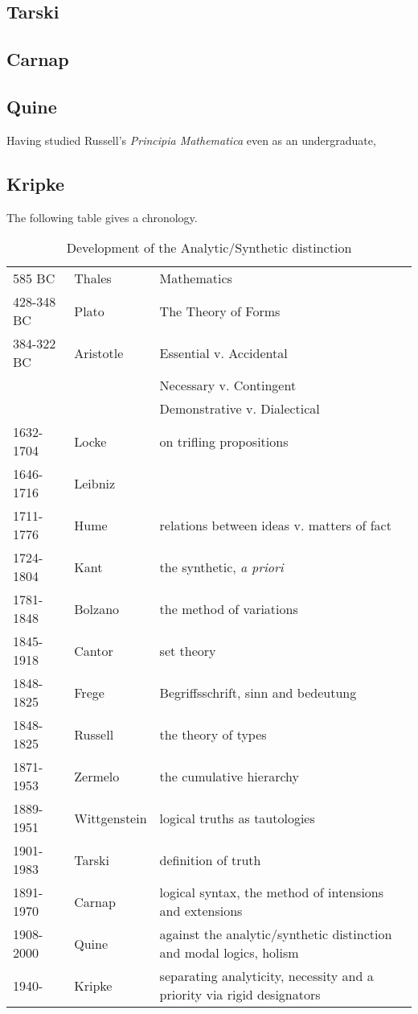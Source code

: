 \subsection{Tarski}

\subsection{Carnap}

\subsection{Quine}

Having studied Russell's \emph{Principia Mathematica} even as an undergraduate, 

\subsection{Kripke}
The following table gives a chronology.

\begin{table}[h]
\begin{center}
\begin{tabular}{|l l p{4.5cm}|}
\hline
585 BC & Thales & Mathematics\\
428-348 BC & Plato & The Theory of Forms\\
384-322 BC & Aristotle & Essential v. Accidental \\
& & Necessary v. Contingent\\
& & Demonstrative v. Dialectical\\
1632-1704 & Locke & on trifling propositions\\
1646-1716 & Leibniz & \\
1711-1776 & Hume & relations between ideas v. matters of fact \\
1724-1804 & Kant & the synthetic, \emph{a priori} \\
1781-1848 & Bolzano & the method of variations \\
1845-1918 & Cantor & set theory \\
1848-1825 & Frege & Begriffsschrift, sinn and bedeutung \\
1848-1825 & Russell & the theory of types \\
1871-1953 & Zermelo & the cumulative hierarchy \\
1889-1951 & Wittgenstein & logical truths as tautologies \\
1901-1983 & Tarski & definition of truth \\
1891-1970 & Carnap & logical syntax, the method of intensions and extensions\\
1908-2000 & Quine & against the analytic/synthetic distinction and modal logics, holism\\
1940- & Kripke & separating analyticity, necessity and a priority via rigid designators\\
\hline
\end{tabular}
\caption{Development of the Analytic/Synthetic distinction}
\label{tab:AnalyticSynthetic}
\end{center}
\end{table}

